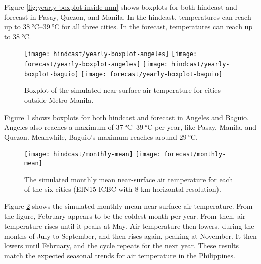 	Figure \ref{fig:yearly-boxplot-inside-mm} shows boxplots for both hindcast and forecast in Pasay, Quezon, and Manila.
	In the hindcast, temperatures can reach up to $\qtyrange{38}{39}{\degreeCelsius}$ for all three cities.
	In the forecast, temperatures can reach up to $\qty{38}{\degreeCelsius}$.

	\begin{figure}	
		\centering
		\texttt{[image: hindcast/yearly-boxplot-angeles]}
		\texttt{[image: forecast/yearly-boxplot-angeles]}
		\texttt{[image: hindcast/yearly-boxplot-baguio]}
		\texttt{[image: forecast/yearly-boxplot-baguio]}		
		\caption{
			Boxplot of the simulated near-surface air temperature for cities outside Metro Manila.
		}
		\label{fig:yearly-boxplot-outside-mm}
	\end{figure}

	Figure \ref{fig:yearly-boxplot-outside-mm} shows boxplots for both hindcast and forecast in Angeles and Baguio.
	Angeles also reaches a maximum of $\qtyrange{37}{39}{\degreeCelsius}$ per year, like Pasay, Manila, and Quezon.
	Meanwhile, Baguio's maximum reaches around $\qty{29}{\degreeCelsius}$. 
 
		
	\begin{figure}	
		\centering
		\texttt{[image: hindcast/monthly-mean]}
		\texttt{[image: forecast/monthly-mean]}
		\caption{
			The simulated monthly mean near-surface air temperature for each of the six cities (EIN15 ICBC with 8 km horizontal resolution).
		}
		\label{fig:hindcast-monthly-mean}
	\end{figure}

	Figure \ref{fig:hindcast-monthly-mean} shows the simulated monthly mean near-surface air temperature.
	From the figure, February appears to be the coldest month per year.
	From then, air temperature rises until it peaks at May.
	Air temperature then lowers, during the months of July to September,
		and then rises again, peaking at November.
	It then lowers until February, and the cycle repeats for the next year.
	These results match the expected seasonal trends for air temperature in the Philippines.
	

